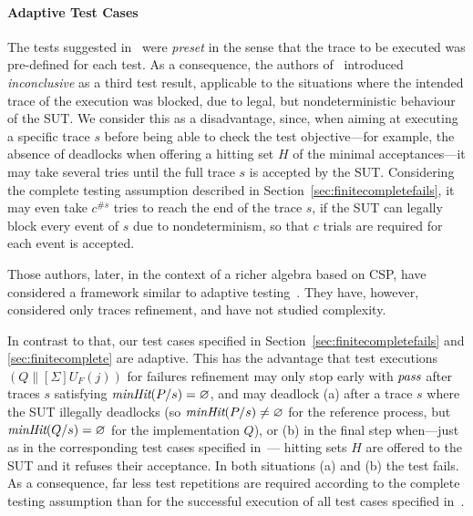 \documentclass[3p,times]{elsarticle}
\newcommand{\epass}{{\text{\it pass}}}
\newcommand{\minhits}{\text{\it minHit}}
\begin{document}
\paragraph{Adaptive Test Cases} The tests suggested
in~\cite{Hennessy:1988:ATP:50497,DBLP:conf/icfem/CavalcantiG07} were
\emph{preset} in the sense that the trace to be executed was pre-defined for
each test. As a consequence, the authors
of~\cite{DBLP:conf/icfem/CavalcantiG07} introduced \emph{inconclusive} as a
third test result, applicable to the situations where the intended trace of
the execution was blocked, due to legal, but nondeterministic behaviour of
the SUT. We consider this as a disadvantage, since, when aiming at executing
a specific trace $s$ before being able to check the test objective---for
example, the absence of deadlocks when offering a hitting set $H$ of the
minimal acceptances---it may take several tries until the full trace $s$ is
accepted by the SUT. Considering the complete testing assumption described in
Section~\ref{sec:finitecompletefails}, it may even take $c^{\#s}$ tries to
reach the end of the trace $s$, if the SUT can legally block every event of
$s$ due to nondeterminism, so that $c$ trials are required for each event is
accepted.

Those authors, later, in the context of a richer algebra based on CSP, have
considered a framework similar to adaptive testing~\cite{CG15}.  They have,
however, considered only traces refinement, and have not studied complexity.

In  contrast to that, our test cases specified in
Section~\ref{sec:finitecompletefails} and \ref{sec:finitecomplete} are
adaptive. This has the advantage that test executions $(Q\parallel[\Sigma]
U_F(j))$ for failures refinement may only stop early with $\epass$ after
traces $s$ satisfying $\minhits(P/s) = \varnothing$, and may deadlock (a)
after a trace $s$ where the SUT illegally deadlocks (so $\minhits(P/s) \neq
\varnothing$ for the reference process, but $\minhits(Q/s) = \varnothing$ for
the implementation $Q$), or (b) in the final step when---just as in the
corresponding test cases specified in~\cite{DBLP:conf/icfem/CavalcantiG07}---
hitting sets $H$ are offered to the SUT and it refuses their acceptance. In
both situations (a) and (b) the test fails. As a consequence, far less test
repetitions are required according to the complete testing assumption than
for the successful execution of all test cases specified
in~\cite{DBLP:conf/icfem/CavalcantiG07}.
\end{document}
